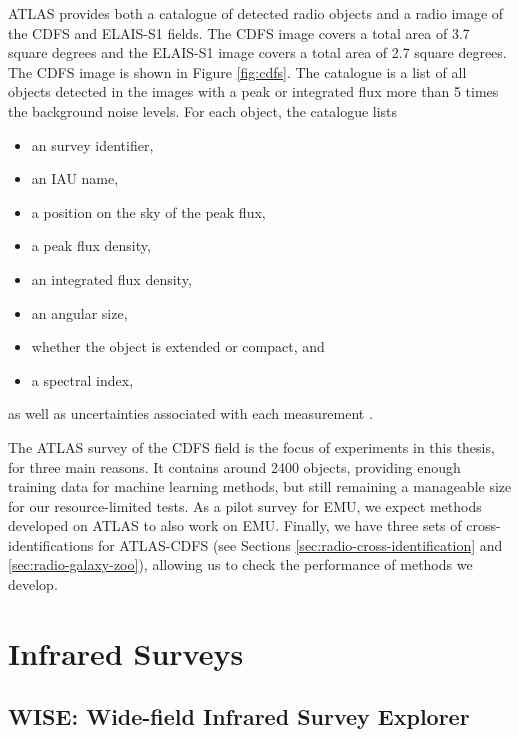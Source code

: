             ATLAS provides both a catalogue of detected radio objects and a
            radio image of the CDFS and ELAIS-S1 fields. The CDFS image covers a
            total area of 3.7 square degrees and the ELAIS-S1 image covers a
            total area of 2.7 square degrees. The CDFS image is shown in Figure
            \ref{fig:cdfs}. The catalogue is a list of all objects detected in
            the images with a peak or integrated flux more than 5 times the
            background noise levels. For each object, the catalogue lists
            \begin{itemize}
                \setlength\itemsep{0 pt}
                \item an survey identifier,
                \item an IAU name,
                \item a position on the sky of the peak flux,
                \item a peak flux density,
                \item an integrated flux density,
                \item an angular size,
                \item whether the object is extended or compact, and
                \item a spectral index,
            \end{itemize}
            as well as uncertainties associated with each measurement
            \citep{franzen15}.

            The ATLAS survey of the CDFS field is the focus of experiments in
            this thesis, for three main reasons. It contains around 2400
            objects, providing enough training data for machine learning
            methods, but still remaining a manageable size for our
            resource-limited tests. As a pilot survey for EMU, we expect methods
            developed on ATLAS to also work on EMU. Finally, we have three sets
            of cross-identifications for ATLAS-CDFS (see Sections
            \ref{sec:radio-cross-identification} and
            \ref{sec:radio-galaxy-zoo}), allowing us to check the performance of
            methods we develop.

    \section{Infrared Surveys}
    \label{sec:infrared-surveys}

        \subsection{WISE: Wide-field Infrared Survey Explorer}
        \label{sec:wise}

